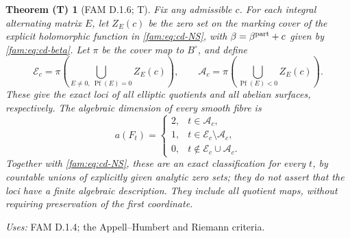 \documentclass[11pt,a4paper]{article}
\theoremstyle{plain}
\newtheorem{theorem}{Theorem (T)}[section]
\theoremstyle{definition}
\begin{document}
\begin{theorem}[FAM D.1.6; T]\label{fam:D.1.6}
Fix any admissible $c$. For each integral alternating matrix $E$, let
$Z_E(c)$ be the zero set on the marking cover of the explicit holomorphic
function in \eqref{fam:eq:cd-NS}, with $\beta=\beta^{\rm part}+c$ given by
\eqref{fam:eq:cd-beta}. Let $\pi$ be the cover map to $B^\circ$, and define
\[
 \mathcal E_c=\pi\!\left(\bigcup_{E\ne0,\ \operatorname{Pf}(E)=0}Z_E(c)\right),
 \qquad
 \mathcal A_c=\pi\!\left(\bigcup_{\operatorname{Pf}(E)<0}Z_E(c)\right).
\]
These give the exact loci of all elliptic quotients and all abelian
surfaces, respectively. The algebraic dimension of every smooth fibre is
\[
 a(F_t)=
 \begin{cases}
 2,&t\in\mathcal A_c,\\
 1,&t\in\mathcal E_c\setminus\mathcal A_c,\\
 0,&t\notin\mathcal E_c\cup\mathcal A_c.
 \end{cases}
\]
Together with \eqref{fam:eq:cd-NS}, these are an exact classification for every
$t$, by countable unions of explicitly given analytic zero sets; they do
not assert that the loci have a finite algebraic description. They include
all quotient maps, without requiring preservation of the first coordinate.
\end{theorem}
\noindent\emph{Uses:} FAM D.1.4; the Appell--Humbert and Riemann criteria.\par
\end{document}
